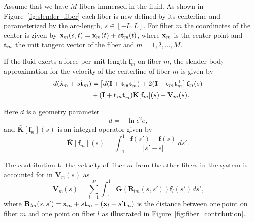 Assume that we have $M$ fibers immersed in the fluid. As shown in Figure~\ref{fig:slender_fiber} each fiber is now defined by its centerline and parameterized by the arc-length, $s \in [-L,L]$. For fiber $m$ the coordinates of the center is given by $\mathbf{x}_m(s,t) = \mathbf{x}_m(t) + s\mathbf{t}_m(t)$, where $\mathbf{x}_m$ is the center point and $\mathbf{t}_m$ the unit tangent vector of the fiber and $m=1,2,\dots,M$.

If the fluid exerts a force per unit length $\mathbf{f}_m$ on fiber $m$, the slender body approximation for the velocity of the centerline of fiber $m$ is given by
\begin{equation}
  \label{eq:velocity_centerline}
  \begin{aligned}
    d(\dot{\mathbf{x}}_m + s \dot{\mathbf{t}}_m) &= \left[ d(\mathbf{I} + \mathbf{t}_m\mathbf{t}_m^\top) + 2(\mathbf{I} - \mathbf{t}_m\mathbf{t}_m^\top\right]\mathbf{f}_m(s) \\
    &+ (\mathbf{I} + \mathbf{t}_m\mathbf{t}_m^\top)\bar{\mathbf{K}}[\mathbf{f}_m](s) + \mathbf{V}_m(s) \text{.}
  \end{aligned}
\end{equation}

Here $d$ is a geometry parameter
\begin{equation}
  \label{eq:geometry_parameter}
  d = -\ln{\epsilon^2e} \text{,}
\end{equation}
and $\bar{\mathbf{K}}[\mathbf{f}_m](s)$ is an integral operator given by
\begin{equation}
  \label{eq:integral_operator}
  \bar{\mathbf{K}}[\mathbf{f}_m](s) = \int_{-1}^{1} \frac{\mathbf{f}(s') - \mathbf{f}(s)}{|s' - s|} \, ds' \text{.}
\end{equation}

The contribution to the velocity of fiber $m$ from the other fibers in the system is accounted for in $\mathbf{V}_m(s)$ as
\begin{equation}
  \label{eq:velocity_contribution}
  \mathbf{V}_m(s) = \sum_{l=1}^M \int_{-1}^{1} \mathbf{G}(\mathbf{R}_{lm}(s,s'))\mathbf{f}_l(s') \, ds' \text{,}
\end{equation}
where $\mathbf{R}_{lm}(s,s') = \mathbf{x}_m + s\mathbf{t}_m - (\mathbf{x}_l + s'\mathbf{t}_m)$ is the distance between one point on fiber $m$ and one point on fiber $l$ as illustrated in Figure~\ref{fig:fiber_contribution}.

